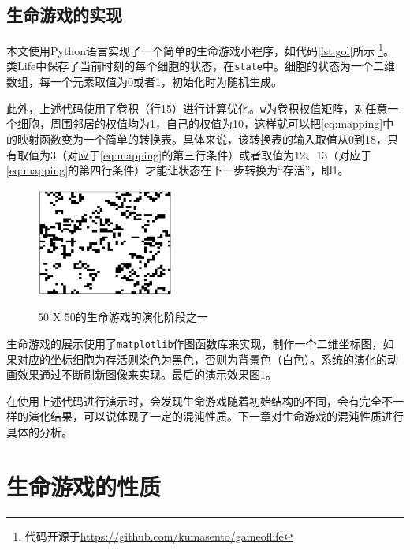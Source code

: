\documentclass[a4paper,12pt]{article}
\begin{document}
\subsection{生命游戏的实现}

本文使用Python语言实现了一个简单的生命游戏小程序，如代码\ref{lst:gol}所示
\footnote{代码开源于\url{https://github.com/kumasento/gameoflife}}。类Life中保存了当前时刻的每个细胞的状态，在\texttt{state}中。细胞的状态为一个二维数组，每一个元素取值为0或者1，初始化时为随机生成。
\singlespacing
{}
\onehalfspacing

此外，上述代码使用了卷积（行15）进行计算优化。\texttt{w}为卷积权值矩阵，对任意一个细胞，周围邻居的权值均为1，自己的权值为10，这样就可以把\ref{eq:mapping}中的映射函数变为一个简单的转换表。具体来说，该转换表的输入取值从0到18，只有取值为3（对应于\ref{eq:mapping}的第三行条件）或者取值为12、13（对应于\ref{eq:mapping}的第四行条件）才能让状态在下一步转换为“存活”，即1。

\begin{figure}[!ht]
	\centering
	\includegraphics[width=0.4\textwidth]{images/gol.png}
	\label{fig:gol}
	\caption{50 X 50的生命游戏的演化阶段之一}
\end{figure}

生命游戏的展示使用了\texttt{matplotlib}作图函数库来实现，制作一个二维坐标图，如果对应的坐标细胞为存活则染色为黑色，否则为背景色（白色）。系统的演化的动画效果通过不断刷新图像来实现。最后的演示效果图\ref{fig:gol}。

在使用上述代码进行演示时，会发现生命游戏随着初始结构的不同，会有完全不一样的演化结果，可以说体现了一定的混沌性质。下一章对生命游戏的混沌性质进行具体的分析。

\section{生命游戏的性质}
\end{document}
